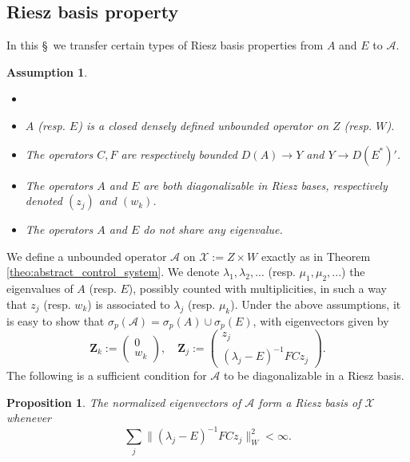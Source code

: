 \documentclass[10pt]{article}
\newtheorem{Proposition}[Theorem]{Proposition}
\newtheorem{Assumption}[Theorem]{Assumption}
\begin{document}
\subsection{Riesz basis property}
In this \S~we transfer certain types of Riesz basis properties from $A$ and $E$ to $\mathcal{A}$. 
\begin{Assumption}\label{ass:coupled_spectrum}
\begin{itemize}
\item[]
\item $A$ (resp. $E$) is a closed densely defined unbounded operator on $Z$ (resp. $W$). 
\item The operators $C,F$ are respectively bounded $D(A) \to Y$ and $Y \to D(E^*)'$.
\item The operators $A$ and $E$ are both diagonalizable in Riesz bases, respectively denoted $(z_j)$ and $(w_k)$. 
\item The operators $A$ and $E$ do not share any eigenvalue.
\end{itemize}
\end{Assumption}
We define a unbounded operator $\mathcal{A}$ on $\mathcal{X} := Z \times W$ exactly as in Theorem \ref{theo:abstract_control_system}. We denote $\lambda_1, \lambda_2,...$ (resp. $\mu_1,\mu_2,...$) the eigenvalues of $A$ (resp. $E$), possibly counted with multiplicities, in such a way that $z_j$ (resp. $w_k$) is associated to $\lambda_j$ (resp. $\mu_k$). Under the above assumptions, it is easy to show that $\sigma_p(\mathcal{A}) = \sigma_p(A) \cup \sigma_p(E)$, with eigenvectors given by 
\[
\mathbf{Z}_k := \left( \begin{array}{c}
0 \\
w_k
\end{array} \right),\quad \mathbf{Z}_j := \left( \begin{array}{c}
z_j \\
(\lambda_j - E)^{-1}FCz_j
\end{array} \right).
\]
The following is a sufficient condition for $\mathcal{A}$ to be diagonalizable in a Riesz basis. 
\begin{Proposition}\label{prop:riesz_basis}
The normalized eigenvectors of $\mathcal{A}$ form a Riesz basis of $\mathcal{X}$ whenever
\begin{equation}\label{eq:hyp_quad_close}
\sum_j \|(\lambda_j - E)^{-1}FCz_j \|_W^2 < \infty.
\end{equation}
\end{Proposition}
\end{document}
